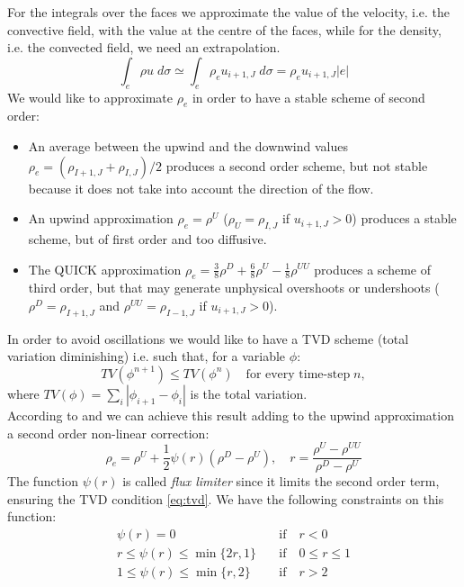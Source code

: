 \documentclass[12pt, a4paper]{article}
\begin{document}
For the integrals over the faces we approximate the value of the velocity, i.e. 
the convective field, with the value at the centre of the faces, while for the 
density, i.e. the convected field, we need an extrapolation.
\begin{equation*}
\int_e \rho u \; d\sigma \simeq \int_e \rho_e u_{i+1,J} \; d\sigma = \rho_e 
u_{i+1,J} |e|
\end{equation*}
We would like to approximate $\rho_e$ in order to have a stable scheme of 
second order:
\begin{itemize}
	\item An average between the upwind and the downwind values $\rho_e = 
	(\rho_{I+1,J}+\rho_{I,J})/2$ produces a second 
	order scheme, but not stable because it does not take into account the 
	direction of the flow.
	\item An upwind approximation $\rho_e = \rho^U$ ($\rho_U = \rho_{I,J}$ 
	if $u_{i+1,J}>0$) produces a stable scheme, but of first order and too 
	diffusive.
	\item The QUICK approximation $\rho_e = \frac{3}{8}\rho^D+\frac{6}{8} 
	\rho^U - \frac{1}{8} \rho^{UU}$ produces a scheme of third order, 
	but that may generate unphysical overshoots or undershoots ($\rho^D = 
	\rho_{I+1,J}$ 
	and $\rho^{UU} = \rho_{I-1,J}$ if $u_{i+1,J}>0$).
\end{itemize}
In order to avoid oscillations we would like to have a TVD scheme (total 
variation diminishing) i.e. such that, for a variable $\phi$:
\begin{equation} \label{eq:tvd}
TV(\phi ^{n+1}) \leq TV(\phi^n) \quad \text{for every time-step} \; n,
\end{equation}
where $TV(\phi) = \sum_i |\phi_{i+1} 
- \phi_i|$ is the total variation.\\
According to \cite{sweeby} and \cite{ver_mal} we can achieve this result adding 
to the upwind approximation a second order non-linear correction:
\begin{equation*}
	\rho_e = \rho^U + \frac{1}{2}\psi(r)(\rho^D - \rho^U), \quad r = 
	\frac{\rho^U - \rho^{UU}}{\rho^D - \rho^U}
\end{equation*} 
The function $\psi(r)$ is called \emph{flux limiter} since it limits the second 
order term, ensuring the TVD condition \eqref{eq:tvd}. We have the following 
constraints on this function:
\begin{align*}
\psi(r) = 0 \quad &\text{if} \quad r < 0\\
r \leq \psi(r) \leq \min \{2r, 1\} \quad &\text{if} \quad 0 \leq r \leq 1\\
1 \leq \psi(r) \leq \min \{r, 2\} \quad &\text{if} \quad r > 2
\end{align*}
\end{document}
